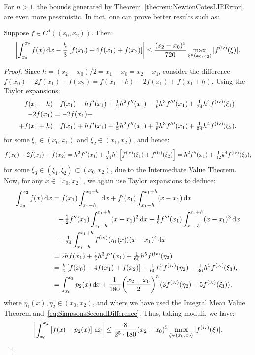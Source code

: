 For $n>1$, the bounds generated by Theorem~\ref{theorem:NewtonCotesLIRError} are even more pessimistic. In fact, one can prove better results such as:
\begin{theorem}
Suppose $f\in C^4((x_0,x_2))$. Then:
\[
\left|\int_{x_0}^{x_2}f(x)\ud x - \dfrac{h}{3}\br[f(x_0)+4f(x_1)+f(x_2)]\right| \le \dfrac{(x_2-x_0)^5}{720}\max_{\xi\in(x_0,x_2)}|f^{({\rm iv})}(\xi)|.
\]
\end{theorem}
\begin{proof}
Since $h = (x_2-x_0)/2 = x_1-x_0 = x_2-x_1$, consider the difference $f(x_0) -2f(x_1)+f(x_2) = f(x_1-h)-2f(x_1)+f(x_1+h)$. Using the Taylor expansions:
\begin{align*}
f(x_1-h) & \quad f(x_1) - hf'(x_1) + \tfrac{1}{2}h^2f''(x_1) - \tfrac{1}{6}h^3f'''(x_1) + \tfrac{1}{24}h^4f^{({\rm iv})}(\xi_1)\\
-2f(x_1) & = -2f(x_1) +\\
+f(x_1+h) & \quad f(x_1) + hf'(x_1) + \tfrac{1}{2}h^2f''(x_1) + \tfrac{1}{6}h^3f'''(x_1) + \tfrac{1}{24}h^4f^{({\rm iv})}(\xi_2),
\end{align*}
for some $\xi_1\in(x_0,x_1)$ and $\xi_2\in(x_1,x_2)$, and hence:
\begin{equation}\label{eq:SimpsonsSecondDifference}
f(x_0)-2f(x_1)+f(x_2) = h^2f''(x_1) + \tfrac{1}{24}h^4\br[f^{({\rm iv})}(\xi_1) + f^{({\rm iv})}(\xi_2)] = h^2f''(x_1) + \tfrac{1}{12}h^4f^{({\rm iv})}(\xi_3),
\end{equation}
for some $\xi_3\in(\xi_1,\xi_2)\subset(x_0,x_2)$, due to the Intermediate Value Theorem. Now, for any $x\in[x_0,x_2]$, we again use Taylor expansions to deduce:
\begin{align*}
\int_{x_0}^{x_2}f(x)\ud x & = f(x_1)\int_{x_1-h}^{x_1+h}\ud x + f'(x_1)\int_{x_1-h}^{x_1+h}(x-x_1)\ud x\\
& ~~ + \tfrac{1}{2}f''(x_1)\int_{x_1-h}^{x_1+h}(x-x_1)^2\ud x + \tfrac{1}{6}f'''(x_1)\int_{x_1-h}^{x_1+h}(x-x_1)^3\ud x\\
& ~~ + \tfrac{1}{24}\int_{x_1-h}^{x_1+h} f^{({\rm iv})}(\eta_1(x))(x-x_1)^4\ud x\\
& = 2hf(x_1) + \tfrac{1}{3}h^3f''(x_1) + \tfrac{1}{60}h^5f^{({\rm iv})}(\eta_2)\\
& = \tfrac{h}{3}\br[f(x_0)+4f(x_1)+f(x_2)] + \tfrac{1}{60}h^5f^{({\rm iv})}(\eta_2) - \tfrac{1}{36}h^5f^{({\rm iv})}(\xi_3),\\
& = \int_{x_0}^{x_2}p_2(x)\ud x + \dfrac{1}{180}\left(\dfrac{x_2-x_0}{2}\right)^5(3f^{({\rm iv})}(\eta_2) - 5f^{({\rm iv})}(\xi_3)),
\end{align*}
where $\eta_1(x),\eta_2\in(x_0,x_2)$, and where we have used the Integral Mean Value Theorem and~\eqref{eq:SimpsonsSecondDifference}. Thus, taking moduli, we have:
\[
\left|\int_{x_0}^{x_2}\br[f(x)-p_2(x)]\ud x\right| \le \dfrac{8}{2^5\cdot180}(x_2-x_0)^5\max_{\xi\in(x_0,x_2)}|f^{({\rm iv})}(\xi)|.
\]
\end{proof}

